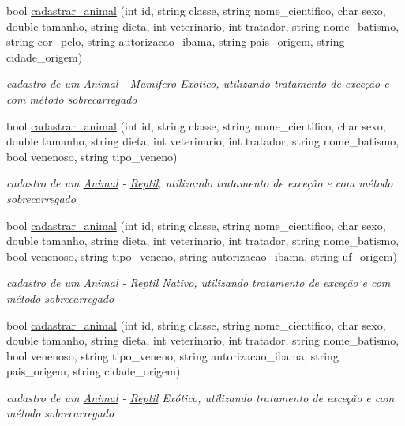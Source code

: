 \begin{DoxyCompactItemize}
bool \mbox{\hyperlink{class_sistema_a5bc6a9264b55170329115d8fa97a5d8f}{cadastrar\+\_\+animal}} (int id, string classe, string nome\+\_\+cientifico, char sexo, double tamanho, string dieta, int veterinario, int tratador, string nome\+\_\+batismo, string cor\+\_\+pelo, string autorizacao\+\_\+ibama, string pais\+\_\+origem, string cidade\+\_\+origem)
\begin{DoxyCompactList}\small\item\em cadastro de um \mbox{\hyperlink{class_animal}{Animal}} -\/ \mbox{\hyperlink{class_mamifero}{Mamifero}} Exotico, utilizando tratamento de exceção e com método sobrecarregado \end{DoxyCompactList}\item 
bool \mbox{\hyperlink{class_sistema_ac30d90899aab0832645814e96cb8de61}{cadastrar\+\_\+animal}} (int id, string classe, string nome\+\_\+cientifico, char sexo, double tamanho, string dieta, int veterinario, int tratador, string nome\+\_\+batismo, bool venenoso, string tipo\+\_\+veneno)
\begin{DoxyCompactList}\small\item\em cadastro de um \mbox{\hyperlink{class_animal}{Animal}} -\/ \mbox{\hyperlink{class_reptil}{Reptil}}, utilizando tratamento de exceção e com método sobrecarregado \end{DoxyCompactList}\item 
bool \mbox{\hyperlink{class_sistema_ac02c0c9e6e1a5546801822c3fb467c36}{cadastrar\+\_\+animal}} (int id, string classe, string nome\+\_\+cientifico, char sexo, double tamanho, string dieta, int veterinario, int tratador, string nome\+\_\+batismo, bool venenoso, string tipo\+\_\+veneno, string autorizacao\+\_\+ibama, string uf\+\_\+origem)
\begin{DoxyCompactList}\small\item\em cadastro de um \mbox{\hyperlink{class_animal}{Animal}} -\/ \mbox{\hyperlink{class_reptil}{Reptil}} Nativo, utilizando tratamento de exceção e com método sobrecarregado \end{DoxyCompactList}\item 
bool \mbox{\hyperlink{class_sistema_a5aa4821903f16d5183e712d7e59c95de}{cadastrar\+\_\+animal}} (int id, string classe, string nome\+\_\+cientifico, char sexo, double tamanho, string dieta, int veterinario, int tratador, string nome\+\_\+batismo, bool venenoso, string tipo\+\_\+veneno, string autorizacao\+\_\+ibama, string pais\+\_\+origem, string cidade\+\_\+origem)
\begin{DoxyCompactList}\small\item\em cadastro de um \mbox{\hyperlink{class_animal}{Animal}} -\/ \mbox{\hyperlink{class_reptil}{Reptil}} Exótico, utilizando tratamento de exceção e com método sobrecarregado \end{DoxyCompactList}\item 

\end{DoxyCompactItemize}

